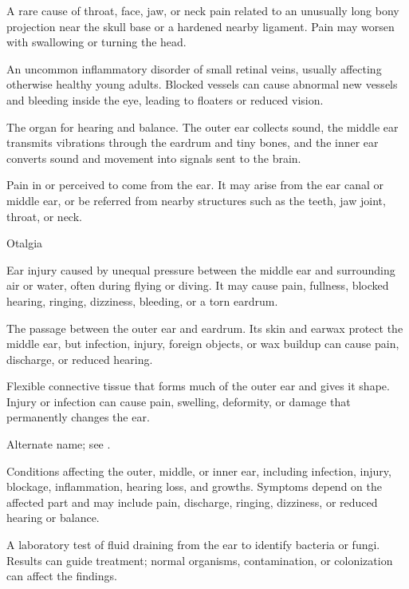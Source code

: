  A rare cause of throat, face, jaw, or neck pain related to an unusually long bony projection near the skull base or a hardened nearby ligament. Pain may worsen with swallowing or turning the head.

 An uncommon inflammatory disorder of small retinal veins, usually affecting otherwise healthy young adults. Blocked vessels can cause abnormal new vessels and bleeding inside the eye, leading to floaters or reduced vision.

 The organ for hearing and balance. The outer ear collects sound, the middle ear transmits vibrations through the eardrum and tiny bones, and the inner ear converts sound and movement into signals sent to the brain.

 Pain in or perceived to come from the ear. It may arise from the ear canal or middle ear, or be referred from nearby structures such as the teeth, jaw joint, throat, or neck.

\synonyms
Otalgia

 Ear injury caused by unequal pressure between the middle ear and surrounding air or water, often during flying or diving. It may cause pain, fullness, blocked hearing, ringing, dizziness, bleeding, or a torn eardrum.

 The passage between the outer ear and eardrum. Its skin and earwax protect the middle ear, but infection, injury, foreign objects, or wax buildup can cause pain, discharge, or reduced hearing.

 Flexible connective tissue that forms much of the outer ear and gives it shape. Injury or infection can cause pain, swelling, deformity, or damage that permanently changes the ear.

 Alternate name; see .

 Conditions affecting the outer, middle, or inner ear, including infection, injury, blockage, inflammation, hearing loss, and growths. Symptoms depend on the affected part and may include pain, discharge, ringing, dizziness, or reduced hearing or balance.

 A laboratory test of fluid draining from the ear to identify bacteria or fungi. Results can guide treatment; normal organisms, contamination, or colonization can affect the findings.

